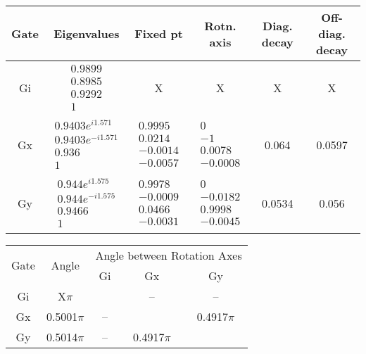 {\begin{table}[h]
\begin{center}
\begin{tabular}[l]{|c|c|c|c|c|c|}
\hline
Gate & Eigenvalues & Fixed pt & Rotn. axis & Diag. decay & Off-diag. decay \\ \hline
Gi & $ \begin{array}{c}
0.9899 \\ 
0.8985 \\ 
0.9292 \\ 
1
 \end{array} $
 & X & X & X & X \\ \hline
Gx & $ \begin{array}{c}
0.9403e^{i1.571} \\ 
0.9403e^{-i1.571} \\ 
0.936 \\ 
1
 \end{array} $
 & $ \begin{array}{c}
0.9995 \\ 
0.0214 \\ 
-0.0014 \\ 
-0.0057
 \end{array} $
 & $ \begin{array}{c}
0 \\ 
-1 \\ 
0.0078 \\ 
-0.0008
 \end{array} $
 & 0.064 & 0.0597 \\ \hline
Gy & $ \begin{array}{c}
0.944e^{i1.575} \\ 
0.944e^{-i1.575} \\ 
0.9466 \\ 
1
 \end{array} $
 & $ \begin{array}{c}
0.9978 \\ 
-0.0009 \\ 
0.0466 \\ 
-0.0031
 \end{array} $
 & $ \begin{array}{c}
0 \\ 
-0.0182 \\ 
0.9998 \\ 
-0.0045
 \end{array} $
 & 0.0534 & 0.056 \\ \hline
\end{tabular}

\vspace{2em}
\begin{tabular}[l]{|c|c|c|c|c|}
\hline
\multirow{2}{*}{Gate} & \multirow{2}{*}{Angle} & \multicolumn{3}{c|}{Angle between Rotation Axes} \\ \cline{3-5}
 & & Gi & Gx & Gy \\ \hline
Gi & X$\pi$ &  & -- & -- \\ \hline
Gx & 0.5001$\pi$ & -- &  & 0.4917$\pi$ \\ \hline
Gy & 0.5014$\pi$ & -- & 0.4917$\pi$ &  \\ \hline
\end{tabular}


\end{center}
\end{table}}
